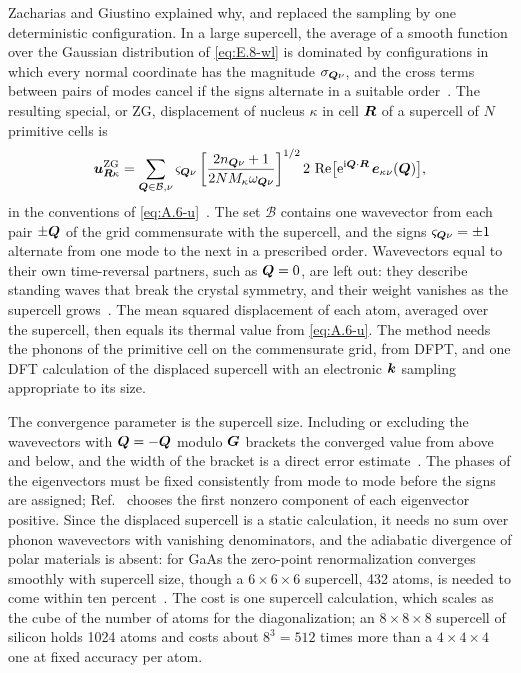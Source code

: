 Zacharias and Giustino explained why, and replaced the sampling by one deterministic configuration. In a large supercell, the average of a smooth function over the Gaussian distribution of \cref{eq:E.8-wl} is dominated by configurations in which every normal coordinate has the magnitude $\sigma_{\bm{Q}\nu}$, and the cross terms between pairs of modes cancel if the signs alternate in a suitable order~\cite[Sect.~III]{zacharias2016one}. The resulting special, or ZG, displacement of nucleus $\kappa$ in cell $\bm{R}$ of a supercell of $N$ primitive cells is
\begin{equation}
  \bm{u}^{\mathrm{ZG}}_{\bm{R}\kappa} = \sum_{\bm{Q}\in\mathcal{B},\nu}\varsigma_{\bm{Q}\nu}\left[\frac{2n_{\bm{Q}\nu} + 1}{2NM_\kappa\omega_{\bm{Q}\nu}}\right]^{1/2}2\,\operatorname{Re}\bigl[\mathrm{e}^{\mathrm{i}\bm{Q}\cdot\bm{R}}\,\bm{e}_{\kappa\nu}(\bm{Q})\bigr] ,
  \label{eq:E.8-zg}
\end{equation}
in the conventions of \cref{eq:A.6-u}~\cite[Eq.~(2)]{zacharias2020theory}. The set $\mathcal{B}$ contains one wavevector from each pair $\pm\bm{Q}$ of the grid commensurate with the supercell, and the signs $\varsigma_{\bm{Q}\nu} = \pm1$ alternate from one mode to the next in a prescribed order. Wavevectors equal to their own time-reversal partners, such as $\bm{Q} = 0$, are left out: they describe standing waves that break the crystal symmetry, and their weight vanishes as the supercell grows~\cite[Sects.~II and~VII\,B]{zacharias2020theory}. The mean squared displacement of each atom, averaged over the supercell, then equals its thermal value from \cref{eq:A.6-u}. The method needs the phonons of the primitive cell on the commensurate grid, from DFPT, and one DFT calculation of the displaced supercell with an electronic $\bm{k}$ sampling appropriate to its size.

The convergence parameter is the supercell size. Including or excluding the wavevectors with $\bm{Q} = -\bm{Q}$ modulo $\bm{G}$ brackets the converged value from above and below, and the width of the bracket is a direct error estimate~\cite[Sect.~VII\,B]{zacharias2020theory}. The phases of the eigenvectors must be fixed consistently from mode to mode before the signs are assigned; Ref.~\cite[Sect.~II]{zacharias2016one} chooses the first nonzero component of each eigenvector positive. Since the displaced supercell is a static calculation, it needs no sum over phonon wavevectors with vanishing denominators, and the adiabatic divergence of polar materials is absent: for GaAs the zero-point renormalization converges smoothly with supercell size, though a $6\times6\times6$ supercell, 432 atoms, is needed to come within ten percent~\cite[Sect.~VII]{zacharias2020theory}. The cost is one supercell calculation, which scales as the cube of the number of atoms for the diagonalization; an $8\times8\times8$ supercell of silicon holds 1024 atoms and costs about $8^3 = 512$ times more than a $4\times4\times4$ one at fixed accuracy per atom.

